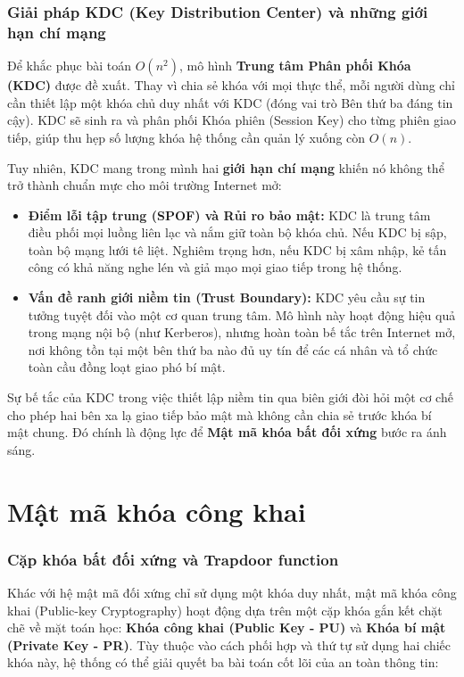 \subsubsection*{Giải pháp KDC (Key Distribution Center) và những giới hạn chí mạng}

Để khắc phục bài toán $O(n^2)$, mô hình \textbf{Trung tâm Phân phối Khóa (KDC)} được đề xuất. Thay vì chia sẻ khóa với mọi thực thể, mỗi người dùng chỉ cần thiết lập một khóa chủ duy nhất với KDC (đóng vai trò Bên thứ ba đáng tin cậy). KDC sẽ sinh ra và phân phối Khóa phiên (Session Key) cho từng phiên giao tiếp, giúp thu hẹp số lượng khóa hệ thống cần quản lý xuống còn $O(n)$.

Tuy nhiên, KDC mang trong mình hai \textbf{giới hạn chí mạng} khiến nó không thể trở thành chuẩn mực cho môi trường Internet mở:

\begin{itemize}
    \item \textbf{Điểm lỗi tập trung (SPOF) và Rủi ro bảo mật:} KDC là trung tâm điều phối mọi luồng liên lạc và nắm giữ toàn bộ khóa chủ. Nếu KDC bị sập, toàn bộ mạng lưới tê liệt. Nghiêm trọng hơn, nếu KDC bị xâm nhập, kẻ tấn công có khả năng nghe lén và giả mạo mọi giao tiếp trong hệ thống.
    \item \textbf{Vấn đề ranh giới niềm tin (Trust Boundary):} KDC yêu cầu sự tin tưởng tuyệt đối vào một cơ quan trung tâm. Mô hình này hoạt động hiệu quả trong mạng nội bộ (như Kerberos), nhưng hoàn toàn bế tắc trên Internet mở, nơi không tồn tại một bên thứ ba nào đủ uy tín để các cá nhân và tổ chức toàn cầu đồng loạt giao phó bí mật.
\end{itemize}

Sự bế tắc của KDC trong việc thiết lập niềm tin qua biên giới đòi hỏi một cơ chế cho phép hai bên xa lạ giao tiếp bảo mật mà không cần chia sẻ trước khóa bí mật chung. Đó chính là động lực để \textbf{Mật mã khóa bất đối xứng} bước ra ánh sáng.

\section{Mật mã khóa công khai}
\label{sec:2.2}

\subsubsection*{Cặp khóa bất đối xứng và Trapdoor function}

Khác với hệ mật mã đối xứng chỉ sử dụng một khóa duy nhất, mật mã khóa công khai (Public-key Cryptography) hoạt động dựa trên một cặp khóa gắn kết chặt chẽ về mặt toán học: \textbf{Khóa công khai (Public Key - PU)} và \textbf{Khóa bí mật (Private Key - PR)}. Tùy thuộc vào cách phối hợp và thứ tự sử dụng hai chiếc khóa này, hệ thống có thể giải quyết ba bài toán cốt lõi của an toàn thông tin:

